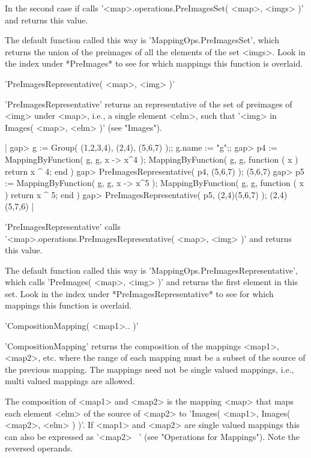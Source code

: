 In the second case if calls '<map>.operations.PreImagesSet( <map>, <imgs>
)' and returns this value.

The default function called this way is 'MappingOps.PreImagesSet',  which
returns the union of the preimages of all the elements of the set <imgs>.
Look in  the index  under *PreImages*  to  see  for which  mappings  this
function is overlaid.


'PreImagesRepresentative( <map>, <img> )'

'PreImagesRepresentative' returns   an representative   of  the  set   of
preimages of <img> under <map>, i.e., a  single  element <elm>, such that
'<img> in Images( <map>, <elm> )' (see "Images").

|    gap> g := Group( (1,2,3,4), (2,4), (5,6,7) );;  g.name := "g";;
    gap> p4 := MappingByFunction( g, g, x -> x^4 );
    MappingByFunction( g, g, function ( x )
        return x ^ 4;
    end )
    gap> PreImagesRepresentative( p4, (5,6,7) );
    (5,6,7)
    gap> p5 := MappingByFunction( g, g, x -> x^5 );
    MappingByFunction( g, g, function ( x )
        return x ^ 5;
    end )
    gap> PreImagesRepresentative( p5, (2,4)(5,6,7) );
    (2,4)(5,7,6) |

'PreImagesRepresentative' calls \\
'<map>.operations.PreImagesRepresentative( <map>, <img> )'
and returns this value.

The       default      function       called      this       way       is
'MappingOps.PreImagesRepresentative',  which  calls  'PreImages(   <map>,
<img>  )' and returns  the first element in this  set.  Look in the index
under  *PreImagesRepresentative* to  see for which mappings this function
is overlaid.


'CompositionMapping( <map1>.. )'

'CompositionMapping' returns  the  composition  of  the  mappings <map1>,
<map2>,  etc.  where  the range  of each mapping must be a subset of  the
source of the  previous  mapping.  The mappings need not be single valued
mappings, i.e., multi valued mappings are allowed.

The composition of <map1> and <map2> is the mapping  <map> that maps each
element <elm> of the source of <map2> to 'Images( <map1>, Images( <map2>,
<elm>  ) )'.  If <map1>  and <map2> are single valued  mappings this  can
also be expressed as '<map2> \*\ <map1>' (see "Operations for Mappings").
Note the reversed operands.

